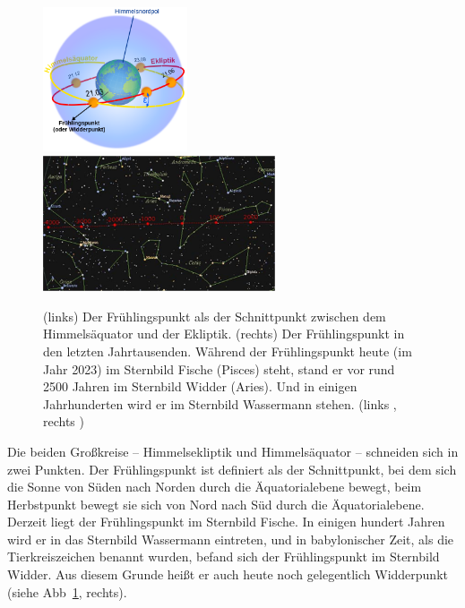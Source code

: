 \begin{figure}[htb]
\includegraphics[width=0.38\textwidth]{./Bilder/Ecliptic.png}\hfill
\includegraphics[width=0.61\textwidth]{./Bilder/Fr-Punkt.png}
\caption{\label{fig_Fruehlingspunkt}%
(links) Der Fr\"uhlingspunkt als der Schnittpunkt zwischen dem Himmels\"aquator und
der Ekliptik. (rechts) Der Fr\"uhlingspunkt in den letzten Jahrtausenden. W\"ahrend der 
Fr\"uhlingspunkt heute (im Jahr 2023)
im Sternbild Fische (Pisces) steht, stand er vor rund 2500 Jahren im Sternbild
Widder (Aries). Und in einigen Jahrhunderten wird er im Sternbild Wassermann stehen.
(links \cite{Wiki_Fruehling}, rechts \cite{Rocket})}
\end{figure}
 
 Die beiden Gro\ss kreise -- Himmelsekliptik und Himmels\"aquator -- schneiden sich in zwei
 Punkten. Der Fr\"uhlingspunkt ist definiert als der Schnittpunkt, bei dem sich die Sonne
 von S\"uden nach Norden durch die \"Aquatorialebene bewegt, beim Herbstpunkt bewegt sie sich von Nord
 nach S\"ud durch die \"Aquatorialebene. Derzeit liegt der Fr\"uhlingspunkt im Sternbild Fische. In einigen
 hundert Jahren wird er in das Sternbild Wassermann eintreten, und in babylonischer Zeit, als die Tierkreiszeichen
 benannt wurden, befand sich der Fr\"uhlingspunkt im Sternbild Widder. Aus diesem Grunde hei\ss t er 
 auch heute noch gelegentlich Widderpunkt (siehe Abb\ \ref{fig_Fruehlingspunkt}, rechts).
 
